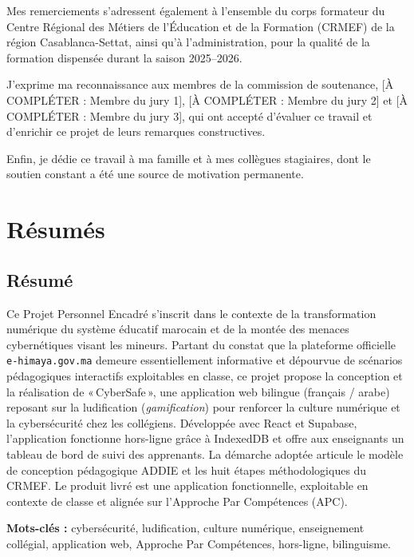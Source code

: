 \documentclass[12pt, a4paper, oneside]{report}
\newcommand{\jurya}{[À COMPLÉTER : Membre du jury 1]}
\newcommand{\juryb}{[À COMPLÉTER : Membre du jury 2]}
\newcommand{\juryc}{[À COMPLÉTER : Membre du jury 3]}
\newcommand{\anneeformation}{2025--2026}
\begin{document}
Mes remerciements s'adressent également à l'ensemble du corps formateur du Centre Régional des Métiers de l'Éducation et de la Formation (CRMEF) de la région Casablanca-Settat, ainsi qu'à l'administration, pour la qualité de la formation dispensée durant la saison \anneeformation.

J'exprime ma reconnaissance aux membres de la commission de soutenance, \jurya, \juryb{} et \juryc, qui ont accepté d'évaluer ce travail et d'enrichir ce projet de leurs remarques constructives.

Enfin, je dédie ce travail à ma famille et à mes collègues stagiaires, dont le soutien constant a été une source de motivation permanente.

\chapter*{Résumés}

\section*{Résumé}
Ce Projet Personnel Encadré s'inscrit dans le contexte de la transformation numérique du système éducatif marocain et de la montée des menaces cybernétiques visant les mineurs. Partant du constat que la plateforme officielle \texttt{e-himaya.gov.ma} demeure essentiellement informative et dépourvue de scénarios pédagogiques interactifs exploitables en classe, ce projet propose la conception et la réalisation de «\,CyberSafe\,», une application web bilingue (français / arabe) reposant sur la ludification (\textit{gamification}) pour renforcer la culture numérique et la cybersécurité chez les collégiens. Développée avec React et Supabase, l'application fonctionne hors-ligne grâce à IndexedDB et offre aux enseignants un tableau de bord de suivi des apprenants. La démarche adoptée articule le modèle de conception pédagogique ADDIE et les huit étapes méthodologiques du CRMEF. Le produit livré est une application fonctionnelle, exploitable en contexte de classe et alignée sur l'Approche Par Compétences (APC).

\textbf{Mots-clés :} cybersécurité, ludification, culture numérique, enseignement collégial, application web, Approche Par Compétences, hors-ligne, bilinguisme.
\end{document}
